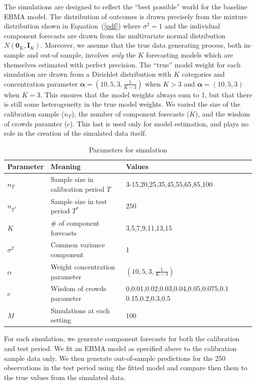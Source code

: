 \documentclass[12pt,fullpage,endnotes]{article}
\begin{document}
The simulations are designed to reflect the ``best possible'' world
for the baseline EBMA model.  The distribution of outcomes is drawn
precisely from the mixture distribution shown in Equation~(\ref{pdf})
where $\sigma^2 = 1$ and the individual component forecasts are drawn
from the multivariate normal distribution $N(\mathbf{0}_K,
\mathbf{I}_K)$.  Moreover, we assume that the true data generating
process, both in-sample and out-of sample, involves \textit{only} the
$K$ forecasting models which are themselves estimated with perfect
precision.  The ``true'' model weight for each simulation are drawn
from a Dirichlet distribution with $K$ categories and concentration
parameter $\mathbf{\alpha} = (10, 5, 3, \frac{1}{K-3})$ when $K>3$ and
$\mathbf{\alpha} = (10, 5, 3)$ when $K=3$.  This ensures that the
model weights always sum to 1, but that there is still some
heterogeneity in the true model weights.  We varied the size of the
calibration sample ($n_T$), the number of component forecasts ($K$),
and the wisdom of crowds paramter ($c$).  This last is used only for
model estimation, and plays no role in the creation of the simulated
data itself.

\begin{table}
  \caption{Parameters for simulation}
\label{params}
\small
\centering

\vspace{.2cm}
\begin{tabular}{lll}
  \toprule
  Parameter & Meaning & Values \\
  \midrule
  $n_{T}$ & Sample size in calibration period $T$  & 3-15,20,25,35,45,55,65,85,100 \\
  $n_{T^\ast}$ &  Sample size in test period $T^\ast$&$250$\\
  $K$ & \# of component forecasts & 3,5,7,9,11,13,15\\
  $\sigma^2$ & Common variance component & 1 \\
  $\alpha$ & Weight concentration parameter  &$ (10, 5, 3, \frac{1}{K-3})$ \\
 $c$ & Wisdom of crowds parameter & 0,0.01,0.02,0.03,0.04,0.05,0.075,0.1 0.15,0.2,0.3,0.5\\
  $M$ & Simulations at each setting & 100 \\
  \bottomrule
\end{tabular}
\end{table}

For each simulation, we generate component forecasts for both the
calibration and test period.  We fit an EBMA model as specified above
to the calibration sample data only.  We then generate out-of-sample
predictions for the 250 observations in the test period using the
fitted model and compare then them to the true values from the
simulated data.  
\end{document}
